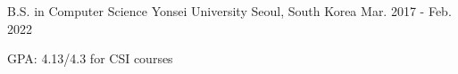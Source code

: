 

\begin{cventries}

  \cventry
    {B.S. in Computer Science} %
    {Yonsei University} %
    {Seoul, South Korea} %
    {Mar. 2017 - Feb. 2022} %
    {
      \begin{cvitems} %
        \item {GPA: 4.13/4.3 for CSI courses}
      \end{cvitems}
    }

\end{cventries}
